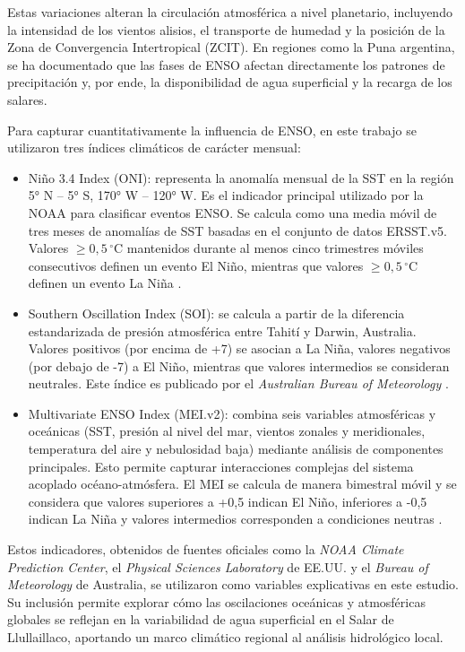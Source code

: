 Estas variaciones alteran la circulación atmosférica a nivel planetario, incluyendo la intensidad de los vientos alisios, el transporte de humedad y la posición de la Zona de Convergencia Intertropical (ZCIT). En regiones como la Puna argentina, se ha documentado que las fases de ENSO afectan directamente los patrones de precipitación y, por ende, la disponibilidad de agua superficial y la recarga de los salares.

Para capturar cuantitativamente la influencia de ENSO, en este trabajo se utilizaron tres índices climáticos de carácter mensual:

\begin{itemize}
    \item Niño 3.4 Index (ONI): representa la anomalía mensual de la SST en la región 5° N – 5° S, 170° W – 120° W. Es el indicador principal utilizado por la NOAA para clasificar eventos ENSO. Se calcula como una media móvil de tres meses de anomalías de SST basadas en el conjunto de datos ERSST.v5. Valores $\geq 0{,}5\,^{\circ}\text{C}$ mantenidos durante al menos cinco trimestres móviles consecutivos definen un evento El Niño, mientras que valores $\geq 0{,}5\,^{\circ}\text{C}$ definen un evento La Niña \parencite{noaaONI}.
    
    \item Southern Oscillation Index (SOI): se calcula a partir de la diferencia estandarizada de presión atmosférica entre Tahití y Darwin, Australia. Valores positivos (por encima de +7) se asocian a La Niña, valores negativos (por debajo de -7) a El Niño, mientras que valores intermedios se consideran neutrales. Este índice es publicado por el \textit{Australian Bureau of Meteorology} \parencite{bom_soi_2024}.
    
    \item Multivariate ENSO Index (MEI.v2): combina seis variables atmosféricas y oceánicas (SST, presión al nivel del mar, vientos zonales y meridionales, temperatura del aire y nebulosidad baja) mediante análisis de componentes principales. Esto permite capturar interacciones complejas del sistema acoplado océano-atmósfera. El MEI se calcula de manera bimestral móvil y se considera que valores superiores a +0,5 indican El Niño, inferiores a -0,5 indican La Niña y valores intermedios corresponden a condiciones neutras \parencite{meiindex}.
\end{itemize}

Estos indicadores, obtenidos de fuentes oficiales como la \textit{NOAA Climate Prediction Center}, el \textit{Physical Sciences Laboratory} de EE.UU. y el \textit{Bureau of Meteorology} de Australia, se utilizaron como variables explicativas en este estudio. Su inclusión permite explorar cómo las oscilaciones oceánicas y atmosféricas globales se reflejan en la variabilidad de agua superficial en el Salar de Llullaillaco, aportando un marco climático regional al análisis hidrológico local.


